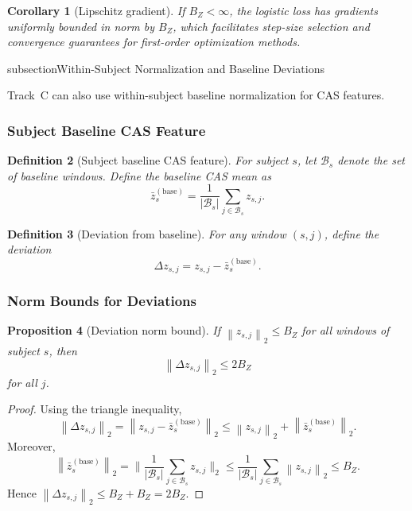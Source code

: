 \documentclass[11pt]{article}
\newtheorem{definition}{Definition}[section]
\newtheorem{proposition}[definition]{Proposition}
\newtheorem{corollary}[definition]{Corollary}
\newcommand{\norm}[1]{\left\lVert #1 \right\rVert}
\newcommand{\abs}[1]{\left\lvert #1 \right\rvert}
\begin{document}
\begin{corollary}[Lipschitz gradient]
If \(B_Z < \infty\), the logistic loss has gradients uniformly bounded in norm by \(B_Z\), which facilitates step-size selection and convergence guarantees for first-order optimization methods.
\end{corollary}

subsection{Within-Subject Normalization and Baseline Deviations}

Track~C can also use within-subject baseline normalization for CAS features.

\subsubsection{Subject Baseline CAS Feature}

\begin{definition}[Subject baseline CAS feature]
For subject \(s\), let \(\mathcal{B}_s\) denote the set of baseline windows.
Define the baseline CAS mean as
\[
  \bar{z}_s^{(\mathrm{base})}
  = \frac{1}{\abs{\mathcal{B}_s}} \sum_{j \in \mathcal{B}_s} z_{s,j}.
\]
\end{definition}

\begin{definition}[Deviation from baseline]
For any window \((s,j)\), define the deviation
\[
  \Delta z_{s,j} = z_{s,j} - \bar{z}_s^{(\mathrm{base})}.
\]
\end{definition}

\subsubsection{Norm Bounds for Deviations}

\begin{proposition}[Deviation norm bound]
If \(\norm{z_{s,j}}_2 \le B_Z\) for all windows of subject \(s\), then
\[
  \norm{\Delta z_{s,j}}_2 \le 2 B_Z
\]
for all \(j\).
\end{proposition}

\begin{proof}
Using the triangle inequality,
\[
  \norm{\Delta z_{s,j}}_2
  = \norm{z_{s,j} - \bar{z}_s^{(\mathrm{base})}}_2
  \le \norm{z_{s,j}}_2 + \norm{\bar{z}_s^{(\mathrm{base})}}_2.
\]
Moreover,
\[
  \norm{\bar{z}_s^{(\mathrm{base})}}_2
  = \biggl\lVert \frac{1}{\abs{\mathcal{B}_s}} \sum_{j \in \mathcal{B}_s} z_{s,j} \biggr\rVert_2
  \le \frac{1}{\abs{\mathcal{B}_s}} \sum_{j \in \mathcal{B}_s} \norm{z_{s,j}}_2
  \le B_Z.
\]
Hence \(\norm{\Delta z_{s,j}}_2 \le B_Z + B_Z = 2 B_Z\).
\end{proof}
\end{document}
